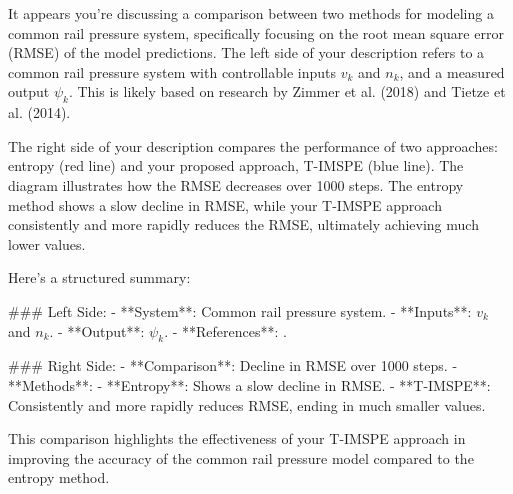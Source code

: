 It appears you're discussing a comparison between two methods for modeling a common rail pressure system, specifically focusing on the root mean square error (RMSE) of the model predictions. The left side of your description refers to a common rail pressure system with controllable inputs \( v_k \) and \( n_k \), and a measured output \( \psi_k \). This is likely based on research by Zimmer et al. (2018) and Tietze et al. (2014).

The right side of your description compares the performance of two approaches: entropy (red line) and your proposed approach, T-IMSPE (blue line). The diagram illustrates how the RMSE decreases over 1000 steps. The entropy method shows a slow decline in RMSE, while your T-IMSPE approach consistently and more rapidly reduces the RMSE, ultimately achieving much lower values.

Here's a structured summary:

### Left Side:
- **System**: Common rail pressure system.
- **Inputs**: \( v_k \) and \( n_k \).
- **Output**: \( \psi_k \).
- **References**: \cite{zimmer2018safe, tietze2014model}.

### Right Side:
- **Comparison**: Decline in RMSE over 1000 steps.
- **Methods**:
  - **Entropy**: Shows a slow decline in RMSE.
  - **T-IMSPE**: Consistently and more rapidly reduces RMSE, ending in much smaller values.

This comparison highlights the effectiveness of your T-IMSPE approach in improving the accuracy of the common rail pressure model compared to the entropy method.